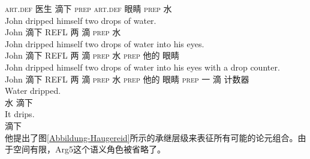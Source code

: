 \begin{exe}
\begin{xlist}[iv.]
\begin{exe}
\begin{xlist}[iv.]
     \textsc{art}.\textsc{def} 医生 滴下 \textsc{prep} \textsc{art}.\textsc{def} 眼睛 \textsc{prep} 水\\
\ex
\gll John dripped himself two drops of water.     \\
     John 滴下 REFL 两 滴 \textsc{prep} 水\\
\ex
\gll John dripped himself two drops of water into his eyes. \\
     John 滴下 REFL 两 滴 \textsc{prep} 水 \textsc{prep} 他的 眼睛\\
\ex
\gll John dripped himself two drops of water into his eyes with a drop counter. \\
     John 滴下 REFL 两 滴 \textsc{prep} 水 \textsc{prep} 他的 眼睛 \textsc{prep} 一 滴 计数器\\
\ex
\gll Water dripped. \\
     水 滴下\\
\ex
\gll It drips. \\
     \expl{} 滴下\\
\zl
他提出了图\ref{Abbildung-Haugereid}所示的承继层级来表征所有可能的论元组合。由于空间有限，Arg5这个语义角色被省略了。


\end{xlist}
\end{exe}
\end{xlist}
\end{exe}

